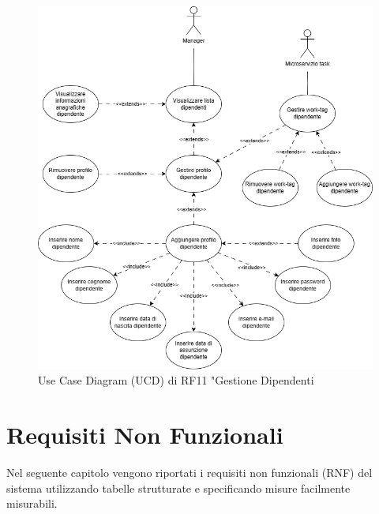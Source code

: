 \documentclass{report}
\begin{document}
\begin{figure}[H]
	\centering\includegraphics[width=1\textwidth]{images/UCD/RF11_gestionedipendenti_UCD.png}
	Use Case Diagram (UCD) di RF11 "Gestione Dipendenti
\end{figure}

\pagebreak

\section{Requisiti Non Funzionali}
Nel seguente capitolo vengono riportati i requisiti non funzionali (RNF) del sistema utilizzando tabelle strutturate e specificando misure facilmente misurabili.
\end{document}
